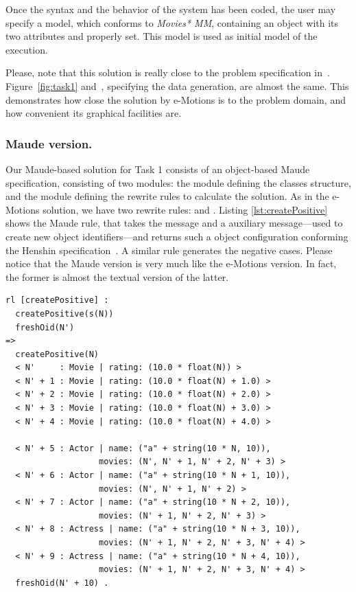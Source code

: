 Once the syntax and the behavior of the system has been coded, the user may specify a model, which conforms to \textit{Movies* MM}, containing an object  with its two attributes  and  properly set. This model is used as initial model of the execution.

Please, note that this solution is really close to the problem specification in~\cite{imdbcase}. Figure~\ref{fig:task1} and~\cite[Figure~2]{imdbcase}, specifying the data generation, are almost the same. This demonstrates how close the solution by e-Motions is to the problem domain, and how convenient its graphical facilities are.

\subsubsection{Maude version.}
Our Maude-based solution for Task 1 consists of an object-based Maude specification, consisting of two modules: the  module defining the classes structure, and the  module defining the rewrite rules to calculate the solution. As in the e-Motions solution, we have two rewrite rules:  and . Listing \ref{lst:createPositive} shows the  Maude rule, that takes the  message and a  auxiliary message---used to create new object identifiers---and returns such a object configuration conforming the Henshin specification~\cite{imdbcase}. A similar rule generates the negative cases. Please notice that the Maude version is very much like the e-Motions version. In fact, the former is almost the textual version of the latter. 

\begin{lstlisting}[caption=\code{createPositive} Maude rule., label=lst:createPositive]
rl [createPositive] :
  createPositive(s(N))
  freshOid(N')
=>
  createPositive(N)
  < N'     : Movie | rating: (10.0 * float(N)) >
  < N' + 1 : Movie | rating: (10.0 * float(N) + 1.0) >
  < N' + 2 : Movie | rating: (10.0 * float(N) + 2.0) >
  < N' + 3 : Movie | rating: (10.0 * float(N) + 3.0) >
  < N' + 4 : Movie | rating: (10.0 * float(N) + 4.0) >
  
  < N' + 5 : Actor | name: ("a" + string(10 * N, 10)),
                   movies: (N', N' + 1, N' + 2, N' + 3) >
  < N' + 6 : Actor | name: ("a" + string(10 * N + 1, 10)),
                   movies: (N', N' + 1, N' + 2) >
  < N' + 7 : Actor | name: ("a" + string(10 * N + 2, 10)),
                   movies: (N' + 1, N' + 2, N' + 3) >
  < N' + 8 : Actress | name: ("a" + string(10 * N + 3, 10)),
                   movies: (N' + 1, N' + 2, N' + 3, N' + 4) >
  < N' + 9 : Actress | name: ("a" + string(10 * N + 4, 10)),
                   movies: (N' + 1, N' + 2, N' + 3, N' + 4) >
  freshOid(N' + 10) .
\end{lstlisting}

